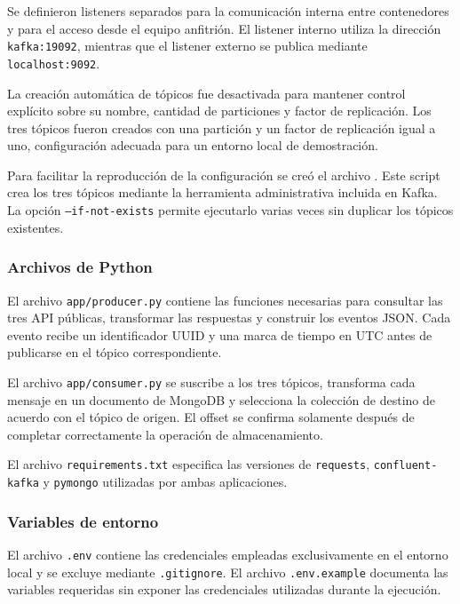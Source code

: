 Se definieron listeners separados para la comunicación interna entre
contenedores y para el acceso desde el equipo anfitrión. El listener interno
utiliza la dirección \texttt{kafka:19092}, mientras que el listener externo se
publica mediante \texttt{localhost:9092}.

La creación automática de tópicos fue desactivada para mantener control
explícito sobre su nombre, cantidad de particiones y factor de replicación. Los
tres tópicos fueron creados con una partición y un factor de replicación igual
a uno, configuración adecuada para un entorno local de demostración.

Para facilitar la reproducción de la configuración se creó el archivo
. Este script crea los tres tópicos mediante
la herramienta administrativa incluida en Kafka. La opción
\texttt{--if-not-exists} permite ejecutarlo varias veces sin duplicar los
tópicos existentes.

\subsubsection{Archivos de Python}

El archivo \texttt{app/producer.py} contiene las funciones necesarias para
consultar las tres API públicas, transformar las respuestas y construir los
eventos JSON. Cada evento recibe un identificador UUID y una marca de tiempo en
UTC antes de publicarse en el tópico correspondiente.

El archivo \texttt{app/consumer.py} se suscribe a los tres tópicos, transforma
cada mensaje en un documento de MongoDB y selecciona la colección de destino de
acuerdo con el tópico de origen. El offset se confirma solamente después de
completar correctamente la operación de almacenamiento.

El archivo \texttt{requirements.txt} especifica las versiones de
\texttt{requests}, \texttt{confluent-kafka} y \texttt{pymongo} utilizadas por
ambas aplicaciones.

\subsubsection{Variables de entorno}

El archivo \texttt{.env} contiene las credenciales empleadas exclusivamente en
el entorno local y se excluye mediante \texttt{.gitignore}. El archivo
\texttt{.env.example} documenta las variables requeridas sin exponer las
credenciales utilizadas durante la ejecución.

